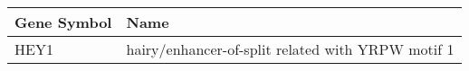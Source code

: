 \begin{tabular}{ll}
\toprule
Gene Symbol &                                              Name \\
\midrule
       HEY1 & hairy/enhancer-of-split related with YRPW motif 1 \\
\bottomrule
\end{tabular}

